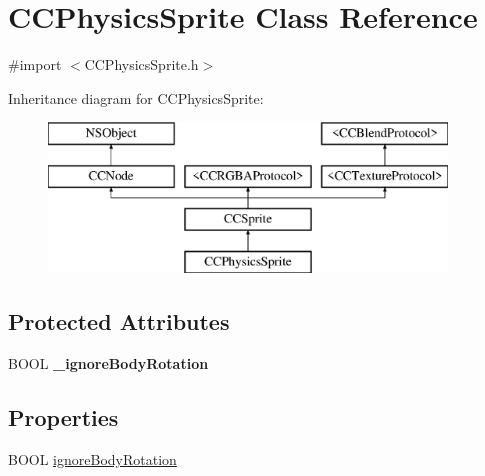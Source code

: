 \hypertarget{interface_c_c_physics_sprite}{\section{C\-C\-Physics\-Sprite Class Reference}
\label{interface_c_c_physics_sprite}
}


{\ttfamily \#import $<$C\-C\-Physics\-Sprite.\-h$>$}

Inheritance diagram for C\-C\-Physics\-Sprite\-:\begin{figure}[H]
\begin{center}
\leavevmode
\includegraphics[height=4.000000cm]{interface_c_c_physics_sprite}
\end{center}
\end{figure}
\subsection*{Protected Attributes}
\begin{DoxyCompactItemize}
\item 
\hypertarget{interface_c_c_physics_sprite_ae5c556a5b6b6fa7116ce64f5a5d37a58}{B\-O\-O\-L {\bfseries \-\_\-ignore\-Body\-Rotation}}\label{interface_c_c_physics_sprite_ae5c556a5b6b6fa7116ce64f5a5d37a58}

\end{DoxyCompactItemize}
\subsection*{Properties}
\begin{DoxyCompactItemize}
\item 
B\-O\-O\-L \hyperlink{interface_c_c_physics_sprite_abf440ef38284e79607c4c526d5cead43}{ignore\-Body\-Rotation}
\end{DoxyCompactItemize}



